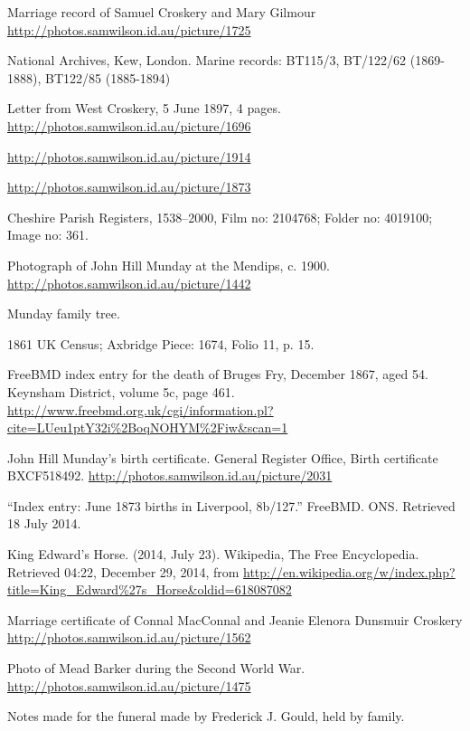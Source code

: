 \begin{thebibliography}{99}
	Marriage record of Samuel Croskery and Mary Gilmour
	\url{http://photos.samwilson.id.au/picture/1725}

	National Archives, Kew, London.
	Marine records: BT115/3, BT/122/62 (1869-1888), BT122/85 (1885-1894)

	Letter from West Croskery, 5 June 1897, 4 pages.
	\url{http://photos.samwilson.id.au/picture/1696}

	\url{http://photos.samwilson.id.au/picture/1914}

	\url{http://photos.samwilson.id.au/picture/1873}

	Cheshire Parish Registers, 1538--2000, Film no: 2104768; Folder no: 4019100; Image no: 361.

	Photograph of John Hill Munday at the Mendips, c. 1900.
	\url{http://photos.samwilson.id.au/picture/1442}

	Munday family tree.

	1861 UK Census; Axbridge Piece: 1674, Folio 11, p. 15.

	FreeBMD index entry for the death of Bruges Fry, December 1867, aged 54. 
	Keynsham District, volume 5c, page 461.
	\url{http://www.freebmd.org.uk/cgi/information.pl?cite=LUeu1ptY32i\%2BoqNOHYM\%2Fiw&scan=1}

	John Hill Munday's birth certificate. General Register Office, Birth certificate BXCF518492.
	\url{http://photos.samwilson.id.au/picture/2031}

	``Index entry: June 1873 births in Liverpool, 8b/127.'' FreeBMD. ONS. Retrieved 18 July 2014.

	King Edward's Horse. (2014, July 23). Wikipedia, The Free Encyclopedia. Retrieved 04:22, December 29, 2014,
	from \url{http://en.wikipedia.org/w/index.php?title=King_Edward\%27s_Horse&oldid=618087082}

	Marriage certificate of Connal MacConnal and Jeanie Elenora Dunsmuir Croskery
	\url{http://photos.samwilson.id.au/picture/1562}

	Photo of Mead Barker during the Second World War. \\
	\url{http://photos.samwilson.id.au/picture/1475}

	Notes made for the funeral made by Frederick J. Gould, held by family.


\end{thebibliography}

